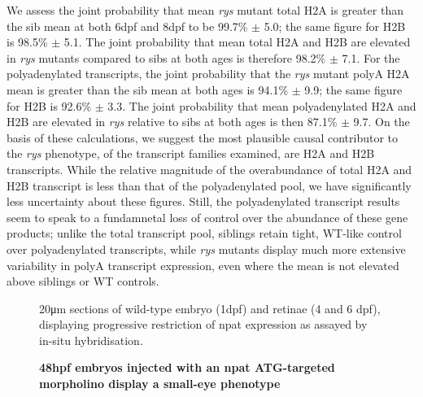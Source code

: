 We assess the joint probability that mean \textit{rys} mutant total H2A is greater than the sib mean at both 6dpf and 8dpf to be 99.7\% $\pm$ 5.0; the same figure for H2B is 98.5\% $\pm$ 5.1. The joint probability that mean total H2A and H2B are elevated in \textit{rys} mutants compared to sibs at both ages is therefore 98.2\% $\pm$ 7.1. For the polyadenylated transcripts, the joint probability that the \textit{rys} mutant polyA H2A mean is greater than the sib mean at both ages is 94.1\% $\pm$ 9.9; the same figure for H2B is 92.6\% $\pm$ 3.3. The joint probability that mean polyadenylated H2A and H2B are elevated in \textit{rys} relative to sibs at both ages is then 87.1\% $\pm$ 9.7. On the basis of these calculations, we suggest the most plausible causal contributor to the \textit{rys} phenotype, of the transcript families examined, are H2A and H2B transcripts. While the relative magnitude of the overabundance of total H2A and H2B transcript is less than that of the polyadenylated pool, we have significantly less uncertainty about these figures. Still, the polyadenylated transcript results seem to speak to a fundamnetal loss of control over the abundance of these gene products; unlike the total transcript pool, siblings retain tight, WT-like control over polyadenylated transcripts, while \textit{rys} mutants display much more extensive variability in polyA transcript expression, even where the mean is not elevated above siblings or WT controls.

\begin{figure}[!h]
    \caption{{\bf 48hpf embryos injected with an npat ATG-targeted morpholino display a small-eye phenotype}}
    20\si{\micro\metre} sections of wild-type embryo (1dpf) and retinae (4 and 6 dpf), displaying progressive restriction of npat expression as assayed by in-situ hybridisation.
    \label{morpholinopics}
\end{figure}

